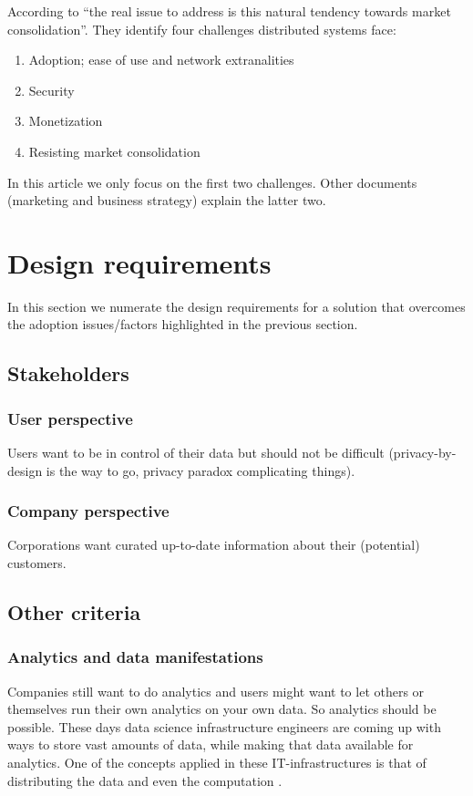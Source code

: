 \documentclass{article}
\begin{document}
According to \cite{mit_techreport} ``the real issue to address is this natural tendency towards market consolidation''. They identify four challenges distributed systems face:
\begin{enumerate}
    \item Adoption; ease of use and network extranalities
    \item Security
    \item Monetization
    \item Resisting market consolidation
\end{enumerate}
In this article we only focus on the first two challenges. Other documents (marketing and business strategy) explain the latter two.


\section{Design requirements}
In this section we numerate the design requirements for a solution that overcomes the adoption issues/factors highlighted in the previous section.

\subsection{Stakeholders}
\subsubsection{User perspective}
Users want to be in control of their data but should not be difficult (privacy-by-design is the way to go, privacy paradox complicating things). 

\subsubsection{Company perspective}
Corporations want curated up-to-date information about their (potential) customers.

\subsection{Other criteria}
\subsubsection{Analytics and data manifestations}
Companies still want to do analytics and users might want to let others or themselves run their own analytics on your own data. So analytics should be possible. These days data science infrastructure engineers are coming up with ways to store vast amounts of data, while making that data available for analytics. One of the concepts applied in these IT-infrastructures is that of distributing the data and even the computation \cite{kleppmann2017designing}.
\end{document}
